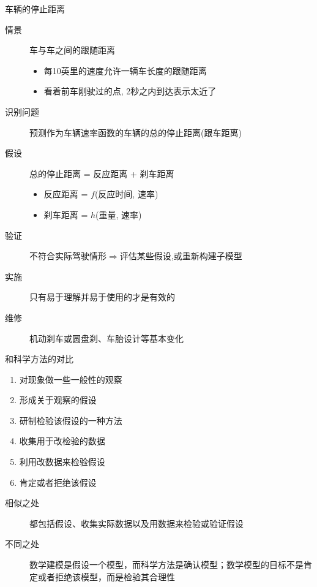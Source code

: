 \documentclass[mathserif]{beamer}
\begin{document}
\begin{frame}{车辆的停止距离}

  \begin{description}
  \item[情景] 车与车之间的跟随距离
    \begin{itemize}
    \item 每10英里的速度允许一辆车长度的跟随距离
    \item 看着前车刚驶过的点, 2秒之内到达表示太近了
    \end{itemize}
  \item[识别问题] 预测作为车辆速率函数的车辆的总的停止距离(跟车距离)
  \item[假设] 总的停止距离 = 反应距离 + 刹车距离
    \begin{itemize}
    \item 反应距离 = $f$(反应时间, 速率)
    \item 刹车距离 = $h$(重量, 速率)
    \end{itemize}
  \item[验证] 不符合实际驾驶情形$\Rightarrow$评估某些假设,或重新构建子模型
  \item[实施] 只有易于理解并易于使用的才是有效的
  \item[维修] 机动刹车或圆盘刹、车胎设计等基本变化
  \end{description}
  
\end{frame}

\begin{frame}{和科学方法的对比}

  \begin{enumerate}
  \item 对现象做一些一般性的观察
  \item 形成关于观察的假设
  \item 研制检验该假设的一种方法
  \item 收集用于改检验的数据
  \item 利用改数据来检验假设
  \item 肯定或者拒绝该假设
  \end{enumerate}

  \begin{description}
  \item[相似之处] 都包括假设、收集实际数据以及用数据来检验或验证假设
  \item[不同之处] 数学建模是假设一个模型，而科学方法是确认模型；数学模型的目标不是肯定或者拒绝该模型，而是检验其合理性
  \end{description}
  
\end{frame}
\end{document}
